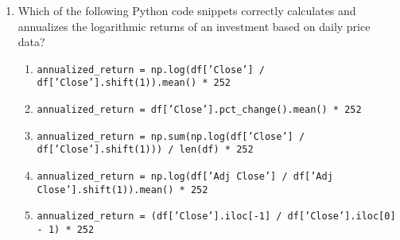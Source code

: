 \documentclass{article}
\begin{document}
\begin{enumerate}
    \item Which of the following Python code snippets correctly calculates and annualizes the logarithmic returns of an investment based on daily price data?
    \begin{enumerate}
        \item \texttt{annualized\_return = np.log(df['Close'] / df['Close'].shift(1)).mean() * 252}
        \item \texttt{annualized\_return = df['Close'].pct\_change().mean() * 252}
        \item \texttt{annualized\_return = np.sum(np.log(df['Close'] / df['Close'].shift(1))) / len(df) * 252}
        \item \texttt{annualized\_return = np.log(df['Adj Close'] / df['Adj Close'].shift(1)).mean() * 252}
        \item \texttt{annualized\_return = (df['Close'].iloc[-1] / df['Close'].iloc[0] - 1) * 252}
    \end{enumerate}
\end{enumerate}
\end{document}
